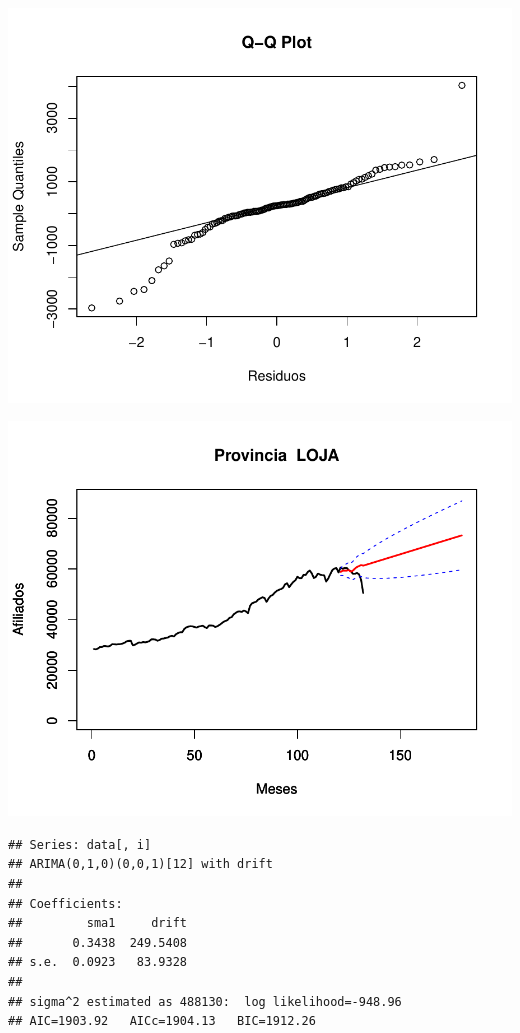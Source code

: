 \documentclass[11pt,a4paper,oneside]{article}\usepackage[]{graphicx}\usepackage[]{color}
\makeatletter
\def\maxwidth{ %
  \ifdim\Gin@nat@width>\linewidth
    \linewidth
  \else
    \Gin@nat@width
  \fi
}
\newenvironment{kframe}{%
 \def\at@end@of@kframe{}%
 \ifinner\ifhmode%
  \def\at@end@of@kframe{\end{minipage}}%
  \begin{minipage}{\columnwidth}%
 \fi\fi%
 \def\FrameCommand##1{\hskip\@totalleftmargin \hskip-\fboxsep
 \colorbox{shadecolor}{##1}\hskip-\fboxsep
     \hskip-\linewidth \hskip-\@totalleftmargin \hskip\columnwidth}%
 \MakeFramed {\advance\hsize-\width
   \@totalleftmargin\z@ \linewidth\hsize
   \@setminipage}}%
 {\par\unskip\endMakeFramed%
 \at@end@of@kframe}
\newenvironment{knitrout}{}{} %
\makeatother
\begin{document}
\begin{knitrout}
{}




{\centering \includegraphics[width=\maxwidth]{figure/unnamed-chunk-16-33} 

}




{\centering \includegraphics[width=\maxwidth]{figure/unnamed-chunk-16-34} 

}


\begin{kframe}\begin{verbatim}
## Series: data[, i] 
## ARIMA(0,1,0)(0,0,1)[12] with drift         
## 
## Coefficients:
##         sma1     drift
##       0.3438  249.5408
## s.e.  0.0923   83.9328
## 
## sigma^2 estimated as 488130:  log likelihood=-948.96
## AIC=1903.92   AICc=1904.13   BIC=1912.26
\end{verbatim}
\end{kframe}


\end{knitrout}
\end{document}
